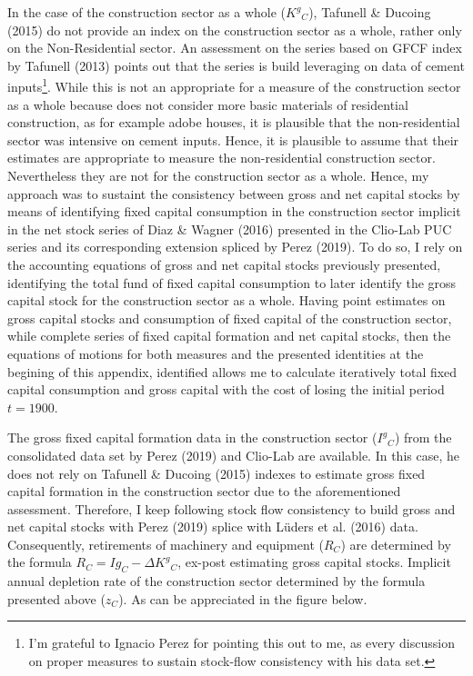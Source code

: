 In the case of the construction sector as a whole (${K^{g}}_{C}$), Tafunell \& Ducoing (2015) do not provide an index on the construction sector as a whole, rather only on the Non-Residential sector. An assessment on the series based on GFCF index by Tafunell (2013) points out that the series is build leveraging on data of cement inputs\footnote{I'm grateful to Ignacio Perez for pointing this out to me, as every discussion on proper measures to sustain stock-flow consistency with his data set.}. While this is not an appropriate for a measure of the construction sector as a whole because does not consider more basic materials of residential construction, as for example adobe houses, it is plausible  that the non-residential sector was intensive on cement inputs. Hence, it is plausible to assume that their estimates are appropriate to measure the non-residential construction sector.  Nevertheless they are not for the construction sector as a whole. Hence, my approach was to sustaint the consistency between gross and net capital stocks by means of identifying fixed capital consumption in the construction sector implicit in the net stock series of Diaz \& Wagner (2016) presented in the Clio-Lab PUC series and its corresponding extension spliced by Perez (2019). To do so, I rely on the accounting equations of gross and net capital stocks previously presented, identifying the total fund of fixed capital consumption to later identify the gross capital stock for the construction sector as a whole. Having point estimates on gross capital stocks and consumption of fixed capital of the construction sector, while complete series of fixed capital formation and net capital stocks, then the equations of motions for both measures and the presented identities at the begining of this appendix, identified allows me to calculate iteratively total fixed capital consumption and gross capital with the cost of losing the initial period $t=1900$.
	
The gross fixed capital formation data in the construction sector (${I^{g}}_{C}$) from the consolidated data set by Perez (2019) and Clio-Lab are available. In this case, he does not rely on Tafunell \& Ducoing (2015) indexes to estimate gross fixed capital formation in the construction sector due to the aforementioned assessment. Therefore, I keep following stock flow consistency to build gross and net capital stocks with Perez (2019) splice with Lüders et al. (2016) data. Consequently, retirements of machinery and equipment ($R_{C}$) are determined by the formula $R_{C} = Ig_{C} - \Delta {K^{g}}_{C}$, ex-post estimating gross capital stocks. Implicit annual depletion rate of the construction sector determined by the formula presented above ($z_{C}$). As can be appreciated in the figure below. 


